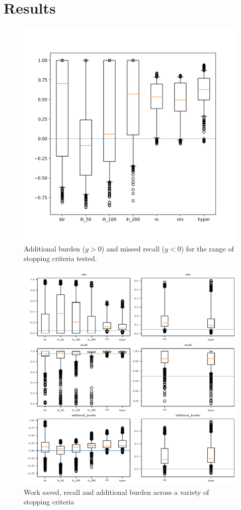\documentclass{bmcart}
\begin{document}
	\section*{Results}
	
	\begin{figure}
		\includegraphics[width=\linewidth]{../images/burden_vs_misrecall}
		\caption{Additional burden ($y > 0$) and missed recall ($ y < 0 $) for the range of stopping criteria tested.}
		\label{additional-burden-missed-recall}
	\end{figure}

	\begin{figure}
		\includegraphics[width=\linewidth]{../images/wss_recall_burden_boxplot}
		\caption{Work saved, recall and additional burden across a variety of stopping criteria}
		\label{additional-burden-missed-recall-boxplots}
	\end{figure}
\end{document}
